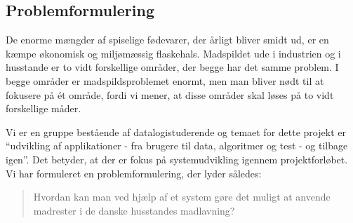 \subsection{Problemformulering}
\label{subsec:problemformulering}

De enorme mængder af spiselige fødevarer, der årligt bliver smidt ud, er en kæmpe økonomisk og miljømæssig flaskehals. Madspildet ude i industrien og i husstande er to vidt forskellige områder, der begge har det samme problem. I begge områder er madspildsproblemet enormt, men man bliver nødt til at fokusere på ét område, fordi vi mener, at disse områder skal løses på to vidt forskellige måder.

Vi er en gruppe bestående af datalogistuderende og temaet for dette projekt er ``udvikling af applikationer - fra brugere til data, algoritmer og test - og tilbage igen''. Det betyder, at der er fokus på systemudvikling igennem projektforløbet. Vi har formuleret en problemformulering, der lyder således:

\begin{quote}
Hvordan kan man ved hjælp af et system gøre det muligt at anvende madrester i de danske husstandes madlavning?
\end{quote} 
